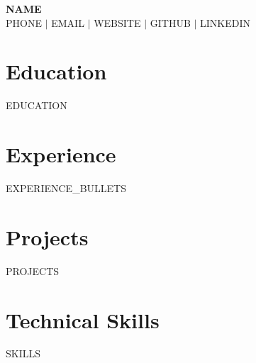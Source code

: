\documentclass[{{FONT_SIZE}}pt,letterpaper]{extarticle}
\begin{document}
\begin{center}
  {\huge \textbf{{{NAME}}}} \\[{{HEADER_SKIP}}]
  {{PHONE}} $|$ {{EMAIL}} $|$ {{WEBSITE}} $|$ {{GITHUB}} $|$ {{LINKEDIN}}
\end{center}

\section{Education}
{{EDUCATION}}

\section{Experience}
{{EXPERIENCE_BULLETS}}

\section{Projects}
{{PROJECTS}}

\section{Technical Skills}
{{SKILLS}}
\end{document}
